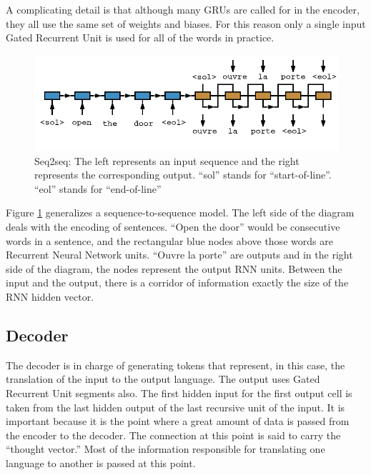 A complicating detail is that although many GRUs are called for in the encoder, they all use the same set of weights and biases. For this reason only a single input Gated Recurrent Unit is used for all of the words in practice. 


\begin{figure}[H]
	\begin{center}
		
		\includegraphics[scale=2]{diagram-nmt03}
		
	\end{center}
	\caption[Sequence-to-Sequence Architecture]{Seq2seq: The left represents an input sequence and the right represents the corresponding output. ``sol'' stands for ``start-of-line''. ``eol'' stands for ``end-of-line''}
	
	\label{diagram-s2s-overview}
	
\end{figure}


Figure \ref{diagram-s2s-overview} generalizes a sequence-to-sequence model. The left side of the diagram deals with the encoding of sentences. ``Open the door'' would be consecutive words in a sentence, and the rectangular blue nodes above those words are Recurrent Neural Network units. ``Ouvre la porte'' are outputs and in the right side of the diagram, the nodes represent the output RNN units. Between the input and the output, there is a corridor of information exactly the size of the RNN hidden vector. 

\subsection{Decoder}
The decoder is in charge of generating tokens that represent, in this case, the translation of the input to the output language. The output uses Gated Recurrent Unit segments also. The first hidden input for the first output cell is taken from the last hidden output of the last recursive unit of the input. It is important because it is the point where a great amount of data is passed from the encoder to the decoder. The connection at this point is said to carry the ``thought vector.'' Most of the information responsible for translating one language to another is passed at this point.

